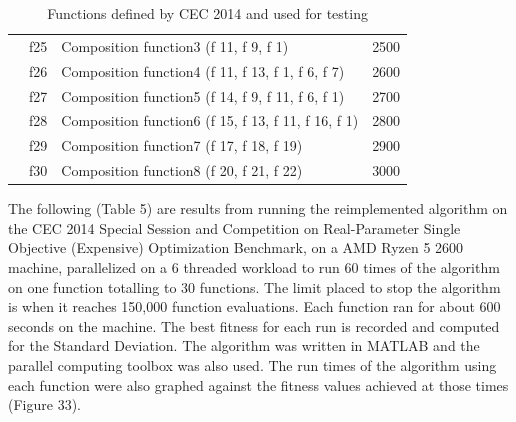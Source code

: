 \begin{table}[]
\begin{tabular}{llll}
    & f25 & Composition function3 (f 11, f 9, f 1) & 2500 \\
    & f26 & Composition function4 (f 11, f 13, f 1, f 6, f 7) & 2600 \\
    & f27 & Composition function5 (f 14, f 9, f 11, f 6, f 1) & 2700 \\
    & f28 & Composition function6 (f 15, f 13, f 11, f 16, f 1) & 2800 \\
    & f29 & Composition function7 (f 17, f 18, f 19) & 2900 \\
    & f30 & Composition function8 (f 20, f 21, f 22) & 3000
\end{tabular}
\caption{Functions defined by CEC 2014 and used for testing}
\end{table}

\clearpage

\par The following (Table 5) are results from running the reimplemented algorithm on the CEC 2014 Special Session and Competition on Real-Parameter Single Objective (Expensive) Optimization Benchmark\cite{liang_2013}, on a AMD Ryzen 5 2600 machine, parallelized on a 6 threaded workload to run 60 times of the algorithm on one function totalling to 30 functions. The limit placed to stop the algorithm is when it reaches 150,000 function evaluations. Each function ran for about 600 seconds on the machine. The best fitness for each run is recorded and computed for the Standard Deviation. The algorithm was written in MATLAB and the parallel computing toolbox was also used. The run times of the algorithm using each function were also graphed against the fitness values achieved at those times (Figure 33).


